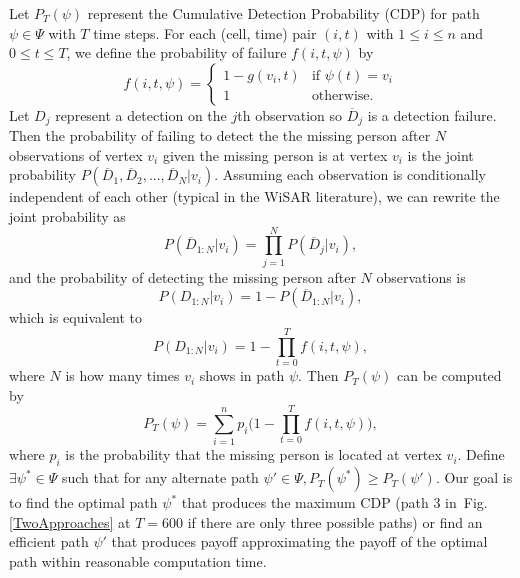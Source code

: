 Let $P_T(\psi)$ represent the Cumulative Detection Probability (CDP) for path $\psi \in \Psi$ with $T$ time steps. For each (cell, time) pair $(i,t)$ with $1 \leq i \leq n$ and $0 \leq t \leq T$, we define the probability of failure $f(i,t,\psi)$ by 
\begin{equation}
f(i,t,\psi) = 
	\left\{
	\begin{array}{ll}
		1-g(v_i,t) & \mbox{if~} \psi(t)=v_i \\
		1 & \mbox{otherwise.}
	\end{array}
	\right.
\label{OneVertex}
\end{equation}
Let $D_j$ represent a detection on the $j$th observation so $\overline{D}_j$ is a detection failure. Then the probability of failing to detect the the missing person after $N$ observations of vertex $v_i$ given the missing person is at vertex $v_i$ is the joint probability $P(\overline{D}_1, \overline{D}_2, ..., \overline{D}_N|v_i)$. Assuming each observation is conditionally independent of each other (typical in the WiSAR literature), we can rewrite the joint probability as
\begin{equation}
P(\overline{D}_{1:N}|v_i) = \prod_{j=1}^{N}P(\overline{D}_j|v_i),
\label{NoDetection}
\end{equation}
and the probability of detecting the missing person after $N$ observations is
\begin{equation}
P(D_{1:N}|v_i) = 1 -  P(\overline{D}_{1:N}|v_i),
\label{Detection}
\end{equation}
which is equivalent to
\begin{equation}
P(D_{1:N}|v_i) = 1 -  \prod_{t=0}^{T}f(i,t,\psi),
\label{Detection2}
\end{equation}
where $N$ is how many times $v_i$ shows in path $\psi$. Then $P_T(\psi)$ can be computed by
\begin{equation}
P_T(\psi) = \sum_{i=1}^{n}p_i\Big(1 - \prod_{t=0}^{T}f(i,t,\psi)\Big),
\label{CDP}
\end{equation}
where $p_i$ is the probability that the missing person is located at vertex $v_i$. Define $\exists\psi^* \!{\in} \Psi$ such that for any alternate path $\psi' \!{\in} \Psi, P_T(\psi^*) \!{\geq} P_T(\psi')$. Our goal is to find the optimal path $\psi^*$ that produces the maximum CDP (path 3 in~Fig.\ref{TwoApproaches} at $T=600$ if there are only three possible paths) or find an efficient path $\psi'$ that produces payoff approximating the payoff of the optimal path within reasonable computation time.

